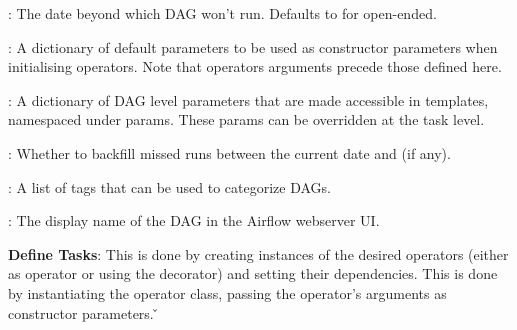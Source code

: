 
\item {}: The date beyond which DAG won't run. Defaults to  for open-ended.
\item {}: A dictionary of default parameters to be used as constructor parameters when initialising
operators. Note that operators arguments precede those defined here.
\item {}: A dictionary of DAG level parameters that are made accessible in templates, namespaced under params.
These params can be overridden at the task level.
\item {}: Whether to backfill missed runs between the current date and  (if any).
\item {}: A list of tags that can be used to categorize DAGs.
\item {}: The display name of the DAG in the Airflow webserver UI\@.
\eit
\item \textbf{Define Tasks}: This is done by creating instances of the desired operators (either as operator or using
the  decorator) and setting their dependencies. This is done by instantiating the operator class, passing
the operator's arguments as constructor parameters. \v

